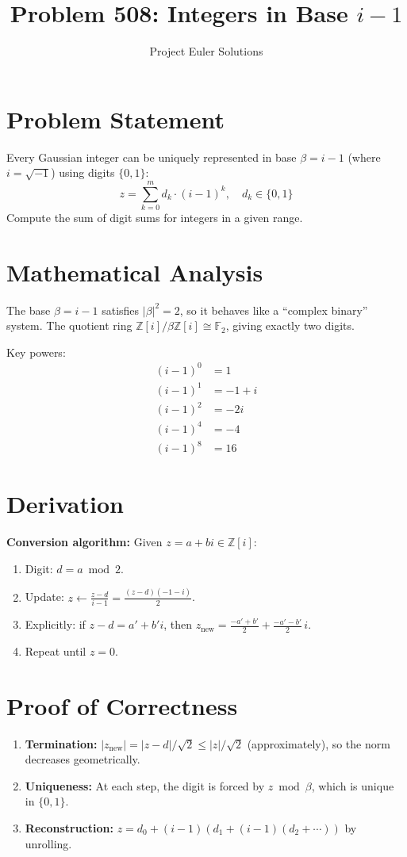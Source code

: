 \documentclass[11pt]{article}
\title{Problem 508: Integers in Base $i{-}1$}
\author{Project Euler Solutions}
\date{}
\begin{document}
\maketitle

\section{Problem Statement}
Every Gaussian integer can be uniquely represented in base $\beta = i - 1$ (where $i = \sqrt{-1}$) using digits $\{0, 1\}$:
\[
z = \sum_{k=0}^{m} d_k \cdot (i-1)^k, \quad d_k \in \{0, 1\}
\]
Compute the sum of digit sums for integers in a given range.

\section{Mathematical Analysis}
The base $\beta = i - 1$ satisfies $|\beta|^2 = 2$, so it behaves like a ``complex binary'' system. The quotient ring $\mathbb{Z}[i]/\beta\mathbb{Z}[i] \cong \mathbb{F}_2$, giving exactly two digits.

Key powers:
\begin{align}
(i-1)^0 &= 1 \\
(i-1)^1 &= -1 + i \\
(i-1)^2 &= -2i \\
(i-1)^4 &= -4 \\
(i-1)^8 &= 16
\end{align}

\section{Derivation}
\textbf{Conversion algorithm:} Given $z = a + bi \in \mathbb{Z}[i]$:
\begin{enumerate}
    \item Digit: $d = a \bmod 2$.
    \item Update: $z \leftarrow \frac{z - d}{i - 1} = \frac{(z-d)(-1-i)}{2}$.
    \item Explicitly: if $z - d = a' + b'i$, then $z_{\text{new}} = \frac{-a'+b'}{2} + \frac{-a'-b'}{2}\,i$.
    \item Repeat until $z = 0$.
\end{enumerate}

\section{Proof of Correctness}
\begin{enumerate}
    \item \textbf{Termination:} $|z_{\text{new}}| = |z-d|/\sqrt{2} \leq |z|/\sqrt{2}$ (approximately), so the norm decreases geometrically.
    \item \textbf{Uniqueness:} At each step, the digit is forced by $z \bmod \beta$, which is unique in $\{0,1\}$.
    \item \textbf{Reconstruction:} $z = d_0 + (i-1)(d_1 + (i-1)(d_2 + \cdots))$ by unrolling.
\end{enumerate}
\end{document}
